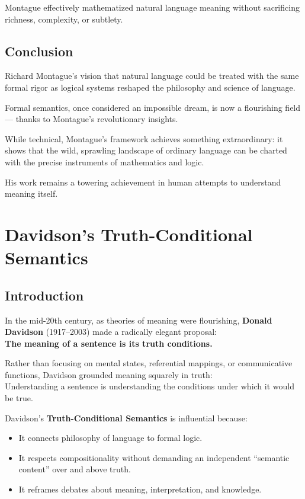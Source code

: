 \documentclass[12pt]{article}
\newcommand{\tightlist}{\itemsep 0pt\parskip 0pt\parsep 0pt}
\begin{document}
Montague effectively mathematized natural language meaning without
sacrificing richness, complexity, or subtlety.

\hypertarget{conclusion-1}{%
\subsection{Conclusion}\label{conclusion-1}}

Richard Montague's vision that natural language could be treated with
the same formal rigor as logical systems reshaped the philosophy and
science of language.

Formal semantics, once considered an impossible dream, is now a
flourishing field --- thanks to Montague's revolutionary insights.

While technical, Montague's framework achieves something extraordinary:
it shows that the wild, sprawling landscape of ordinary language can be
charted with the precise instruments of mathematics and logic.

His work remains a towering achievement in human attempts to understand
meaning itself.

\hypertarget{davidsons-truth-conditional-semantics}{%
\section{Davidson's Truth-Conditional
Semantics}\label{davidsons-truth-conditional-semantics}}

\hypertarget{introduction-2}{%
\subsection{Introduction}\label{introduction-2}}

In the mid-20th century, as theories of meaning were flourishing,
\textbf{Donald Davidson} (1917--2003) made a radically elegant
proposal:\\
\textbf{The meaning of a sentence is its truth conditions.}

Rather than focusing on mental states, referential mappings, or
communicative functions, Davidson grounded meaning squarely in truth:\\
Understanding a sentence is understanding the conditions under which it
would be true.

Davidson's \textbf{Truth-Conditional Semantics} is influential because:

\begin{itemize}
\tightlist
\item
  It connects philosophy of language to formal logic.
\item
  It respects compositionality without demanding an independent
  ``semantic content'' over and above truth.
\item
  It reframes debates about meaning, interpretation, and knowledge.
\end{itemize}
\end{document}
